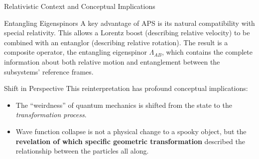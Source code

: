 \begin{frame}{Relativistic Context and Conceptual Implications}
  \begin{block}{Entangling Eigenspinors}
    A key advantage of APS is its natural compatibility with special
    relativity.
    This allows a Lorentz boost (describing relative velocity) to be combined
    with an entanglor (describing relative rotation).
    \pause
    The result is a composite operator, the \alert{entangling eigenspinor}
    $\Lambda_{AB}$, which contains the complete information about both relative
    motion and entanglement between the subsystems' reference frames.
  \end{block}
  \pause
  \begin{alertblock}{Shift in Perspective}
    This reinterpretation has profound conceptual implications:
    \begin{itemize}
      \item The ``weirdness'' of quantum mechanics is shifted from the state to
        the \emph{transformation process}.
      \item Wave function collapse is not a physical change to a spooky object,
        but the \textbf{revelation of which specific geometric transformation}
        described the relationship between the particles all along.
    \end{itemize}
  \end{alertblock}
\end{frame}
